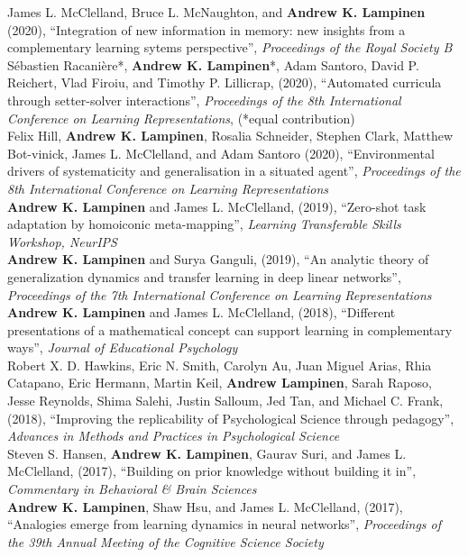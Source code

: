 \documentclass[margin]{res}
\begin{document}
\begin{resume}
James L. McClelland, Bruce L. McNaughton, and \textbf{Andrew K. Lampinen} (2020), {``Integration of new information in memory: new insights from a complementary learning sytems perspective''}, \textit{Proceedings of the Royal Society B} \\[3pt]
S\'ebastien Racani\`ere*, \textbf{Andrew K. Lampinen}*, Adam Santoro, David P. Reichert, Vlad Firoiu, and Timothy P. Lillicrap, (2020), {``Automated curricula through setter-solver interactions'',} \textit{Proceedings of the 8th International Conference on Learning Representations}, (*equal contribution) \\ [3pt] 
Felix Hill, \textbf{Andrew K. Lampinen}, Rosalia Schneider, Stephen Clark, Matthew Bot-vinick, James L. McClelland, and Adam Santoro (2020), {``Environmental drivers of systematicity and generalisation in a situated agent'',} \textit{Proceedings of the 8th International Conference on Learning Representations} \\ [3pt] 
\textbf{Andrew K. Lampinen} and James L. McClelland, (2019), {``Zero-shot task adaptation by homoiconic meta-mapping'',} \textit{Learning Transferable Skills Workshop, NeurIPS} \\ [3pt] 
\textbf{Andrew K. Lampinen} and Surya Ganguli, (2019), {``An analytic theory of generalization dynamics and transfer learning in deep linear networks'',} \textit{Proceedings of the 7th International Conference on Learning Representations} \\[3pt] 
\textbf{Andrew K. Lampinen} and James L. McClelland, (2018), {``Different presentations of a mathematical concept can support learning in complementary ways'',} \textit{Journal of Educational Psychology} \\[3pt]
 Robert X. D. Hawkins, Eric N. Smith, Carolyn Au, Juan Miguel Arias, Rhia Catapano, Eric Hermann, Martin Keil, \textbf{Andrew Lampinen}, Sarah Raposo, Jesse Reynolds, Shima Salehi, Justin Salloum, Jed Tan, and Michael C. Frank, (2018), {``Improving the replicability of Psychological Science through pedagogy'',}  \textit{Advances in Methods and Practices in Psychological Science} \\ [3pt]
Steven S. Hansen, \textbf{Andrew K. Lampinen}, Gaurav Suri, and James L. McClelland, (2017), {``Building on prior knowledge without building it in'',} \textit{Commentary in Behavioral \& Brain Sciences}  \\[3pt]
\textbf{Andrew K. Lampinen}, Shaw Hsu, and James L. McClelland, (2017), {``Analogies emerge from learning dynamics in neural networks'',} \textit{Proceedings of the 39th Annual Meeting of the Cognitive Science Society}  


\end{resume}
\end{document}
